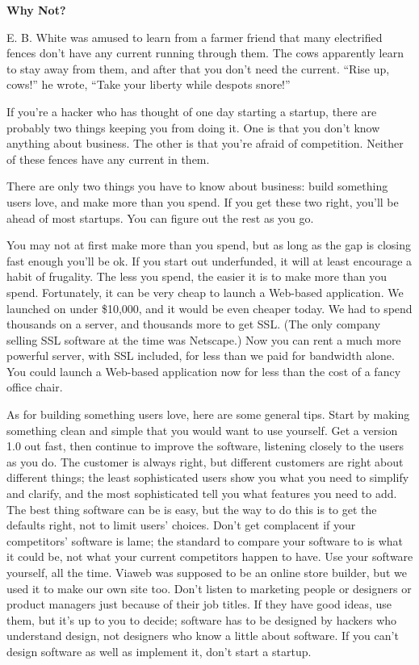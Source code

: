 \textbf{Why Not?}

E. B. White was amused to learn from a farmer friend that many
electrified fences don't have any current running through them. The cows
apparently learn to stay away from them, and after that you don't need
the current. ``Rise up, cows!'' he wrote, ``Take your liberty while
despots snore!''

If you're a hacker who has thought of one day starting a startup, there
are probably two things keeping you from doing it. One is that you don't
know anything about business. The other is that you're afraid of
competition. Neither of these fences have any current in them.

There are only two things you have to know about business: build
something users love, and make more than you spend. If you get these two
right, you'll be ahead of most startups. You can figure out the rest as
you go.

You may not at first make more than you spend, but as long as the gap is
closing fast enough you'll be ok. If you start out underfunded, it will
at least encourage a habit of frugality. The less you spend, the easier
it is to make more than you spend. Fortunately, it can be very cheap to
launch a Web-based application. We launched on under \$10,000, and it
would be even cheaper today. We had to spend thousands on a server, and
thousands more to get SSL. (The only company selling SSL software at the
time was Netscape.) Now you can rent a much more powerful server, with
SSL included, for less than we paid for bandwidth alone. You could
launch a Web-based application now for less than the cost of a fancy
office chair.

As for building something users love, here are some general tips. Start
by making something clean and simple that you would want to use
yourself. Get a version 1.0 out fast, then continue to improve the
software, listening closely to the users as you do. The customer is
always right, but different customers are right about different things;
the least sophisticated users show you what you need to simplify and
clarify, and the most sophisticated tell you what features you need to
add. The best thing software can be is easy, but the way to do this is
to get the defaults right, not to limit users' choices. Don't get
complacent if your competitors' software is lame; the standard to
compare your software to is what it could be, not what your current
competitors happen to have. Use your software yourself, all the time.
Viaweb was supposed to be an online store builder, but we used it to
make our own site too. Don't listen to marketing people or designers or
product managers just because of their job titles. If they have good
ideas, use them, but it's up to you to decide; software has to be
designed by hackers who understand design, not designers who know a
little about software. If you can't design software as well as implement
it, don't start a startup.


